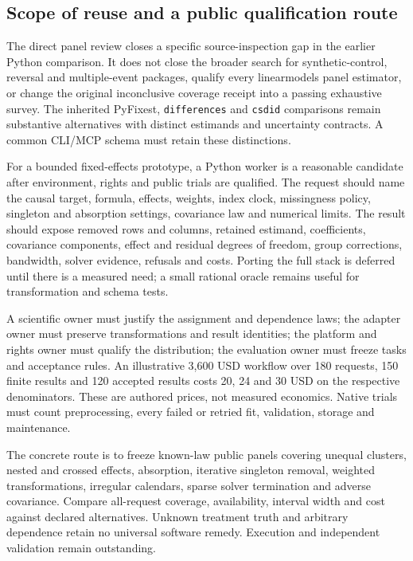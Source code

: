 \subsection{Scope of reuse and a public qualification route}
The direct panel review closes a specific source-inspection gap in the
earlier Python comparison. It does not close the broader search for
synthetic-control, reversal and multiple-event packages, qualify every
linearmodels panel estimator, or change the original inconclusive coverage
receipt into a passing exhaustive survey. The inherited PyFixest,
\texttt{differences} and \texttt{csdid} comparisons remain substantive
alternatives with distinct estimands and uncertainty contracts. A common
CLI/MCP schema must retain these distinctions.
\citep{exec24_lmpanel_reference}

For a bounded fixed-effects prototype, a Python worker is a reasonable
candidate after environment, rights and public trials are qualified.
The request should name the causal target, formula, effects, weights,
index clock, missingness policy, singleton and absorption settings,
covariance law and numerical limits. The result should expose removed rows
and columns, retained estimand, coefficients, covariance components,
effect and residual degrees of freedom, group corrections, bandwidth,
solver evidence, refusals and costs. Porting the full stack is deferred
until there is a measured need; a small rational oracle remains useful
for transformation and schema tests.~\citep{exec24_lmpanel_reference}

A scientific owner must justify the assignment and dependence laws; the
adapter owner must preserve transformations and result identities; the
platform and rights owner must qualify the distribution; the evaluation
owner must freeze tasks and acceptance rules. An illustrative 3,600 USD
workflow over 180 requests, 150 finite results and 120 accepted results
costs 20, 24 and 30 USD on the respective denominators. These are authored
prices, not measured economics. Native trials must count preprocessing,
every failed or retried fit, validation, storage and maintenance.
\citep{exec24_lmpanel_reference}

The concrete route is to freeze known-law public panels covering unequal
clusters, nested and crossed effects, absorption, iterative singleton
removal, weighted transformations, irregular calendars, sparse solver
termination and adverse covariance. Compare all-request coverage,
availability, interval width and cost against declared alternatives.
Unknown treatment truth and arbitrary dependence retain no universal
software remedy. Execution and independent validation remain outstanding.
\citep{exec24_lmpanel_reference}
